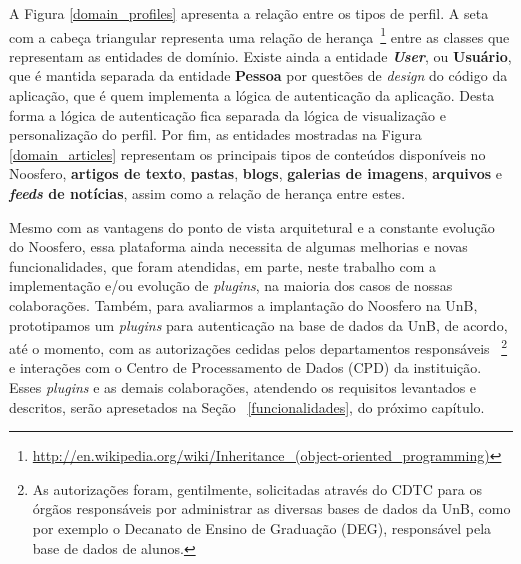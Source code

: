 A Figura \ref{domain_profiles} apresenta a relação entre os tipos de perfil.
A seta com a cabeça triangular representa uma relação de herança~\footnote{%
\url{http://en.wikipedia.org/wiki/Inheritance_(object-oriented_programming)}}
entre as classes que representam as entidades de domínio.
%
Existe ainda a entidade \textbf{\textit{User}}, ou \textbf{Usuário}, que é
mantida separada da entidade \textbf{Pessoa} por questões de \textit{design}
do código da aplicação, que é quem implementa a lógica de autenticação da
aplicação.
%
Desta forma a lógica de autenticação fica separada da lógica de
visualização e personalização do perfil.
%
Por fim, as entidades mostradas na Figura \ref{domain_articles} representam os
principais tipos de conteúdos disponíveis no Noosfero, \textbf{artigos
de texto}, \textbf{pastas}, \textbf{blogs}, \textbf{galerias de imagens},
\textbf{arquivos} e \textbf{\textit{feeds} de notícias}, assim como a
relação de herança entre estes.

Mesmo com as vantagens do ponto de vista arquitetural e a constante evolução do Noosfero,
essa plataforma ainda necessita de algumas melhorias e novas funcionalidades, que foram
atendidas, em parte, neste trabalho com a implementação e/ou evolução de \textit{plugins}, na
maioria dos casos de nossas colaborações.
%
Também, para avaliarmos a implantação do Noosfero na UnB, prototipamos um \textit{plugins} para autenticação
na base de dados da UnB, de acordo, até o momento, com as autorizações cedidas pelos departamentos responsáveis
~\footnote{As autorizações foram, gentilmente, solicitadas através do CDTC para os órgãos responsáveis por administrar
as diversas bases de dados da UnB, como por exemplo o Decanato de Ensino de Graduação (DEG), responsável pela
base de dados de alunos.} e interações com o Centro de Processamento de Dados (CPD) da instituição. Esses
\textit{plugins} e as demais colaborações, atendendo os requisitos levantados e descritos, serão apresetados na Seção
~\ref{funcionalidades}, do próximo capítulo.
